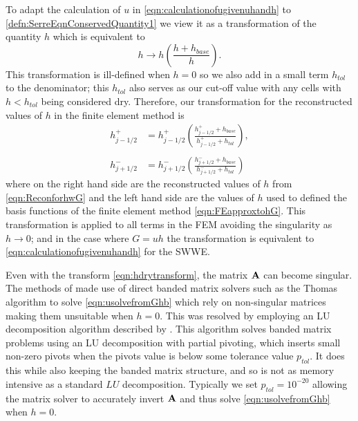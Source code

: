 To adapt the calculation of $u$ in \eqref{eqn:calculationofugivenuhandh} to \eqref{defn:SerreEqnConservedQuantity1} we view it as a transformation of the quantity $h$ which is equivalent to
\begin{equation}
h \rightarrow h \left( \frac{h + h_{base}}{h} \right).
\end{equation}
This transformation is ill-defined when $h = 0$ so we also add in a  small term $h_{tol}$ to the denominator; this $h_{tol}$ also serves as our cut-off value with any cells with $h < h_{tol}$ being considered dry. Therefore, our transformation for the reconstructed values of $h$ in the finite element method is
\begin{subequations}
	\begin{align}
	h^+_{j-1/2} & = h^+_{j-1/2} \left(\frac{ h^+_{j-1/2}  + h_{base}}{h^+_{j-1/2} + h_{tol}}\right) , \\ \nonumber\\
	h^-_{j+1/2} & = h^-_{j+1/2} \left(\frac{ h^-_{j+1/2}  + h_{base}}{h^-_{j+1/2} + h_{tol}}\right)
	\end{align} 
	\label{eqn:hdrytransform}
\end{subequations}
where on the right hand side are the reconstructed values of $h$ from \eqref{eqn:ReconforhwG} and the left hand side are the values of $h$ used to defined the basis functions of the finite element method \eqref{eqn:FEapproxtohG}. This transformation is applied to all terms in the FEM avoiding the singularity as $h \rightarrow 0$; and in the case where $G = uh$ the transformation is equivalent to \eqref{eqn:calculationofugivenuhandh} for the SWWE.

Even with the transform \eqref{eqn:hdrytransform}, the matrix $\mathbf{A}$ can become singular.
The methods of \citet{Zoppou-etal-2017} made use of direct banded matrix solvers such as the Thomas algorithm \cite{Conte-DeBoor-1980} to solve \eqref{eqn:usolvefromGhb} which rely on non-singular matrices making them unsuitable when $h = 0$. This was resolved by employing an LU decomposition algorithm described by \citet{NumRecC-1996}. This algorithm solves banded matrix problems using an LU decomposition with partial pivoting, which inserts small non-zero pivots when the pivots value is below some tolerance value $p_{tol}$. It does this while also keeping the banded matrix structure, and so is not as memory intensive as a standard $LU$ decomposition. Typically we set $p_{tol} = 10^{-20}$ allowing the matrix solver to accurately invert $\mathbf{A}$ and thus solve \eqref{eqn:usolvefromGhb} when $h = 0$. 

